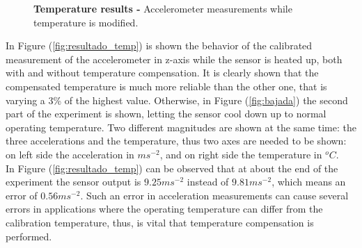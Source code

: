\documentclass[conference]{IEEEtran}
\newcommand{\refp}[1]{(\ref{#1})}
\begin{document}
\begin{figure}[h!]
	\caption{\textbf{Temperature results -} Accelerometer measurements while temperature is modified.}
	\label{fig:temp_res}
\end{figure}

\balance
In Figure \refp{fig:resultado_temp} is shown the behavior of the calibrated measurement of the accelerometer in z-axis while the sensor is heated up, both with and without temperature compensation. It is clearly shown that the compensated temperature is much more reliable than the other one, that is varying a 3\% of the highest value. Otherwise, in Figure \refp{fig:bajada} the second part of the experiment is shown, letting the sensor cool down up to normal operating temperature. Two different magnitudes are shown at the same time: the three accelerations and the temperature, thus two axes are needed to be shown: on left side the acceleration in $ms^{-2}$, and on right side the temperature in $^oC$.\\
In Figure \refp{fig:resultado_temp} can be observed that at about the end of the experiment the sensor output is $9.25ms^{-2}$ instead of $9.81ms^{-2}$, which means an error of $0.56ms^{-2}$. Such an error in acceleration measurements can cause several errors in applications where the operating temperature can differ from the calibration temperature, thus, is vital that temperature compensation is performed.
\end{document}
